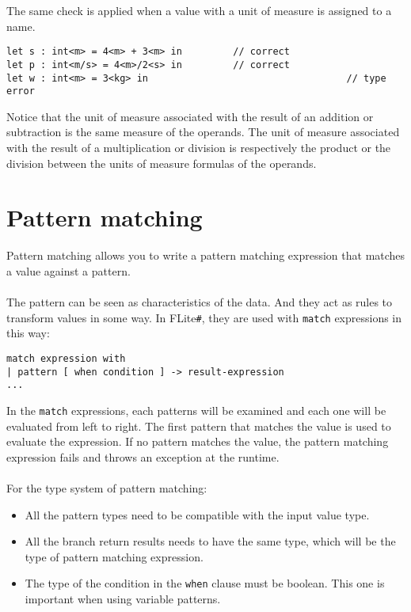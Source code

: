 \documentclass[]{article}
\begin{document}
		The same check is applied when a value with a unit of measure is assigned to a name.
		\begin{lstlisting}[caption={Units of measure with bindings}, label=UOMBind]
let s : int<m> = 4<m> + 3<m> in			// correct
let p : int<m/s> = 4<m>/2<s> in			// correct
let w : int<m> = 3<kg> in									// type error
		\end{lstlisting}
		Notice that the unit of measure associated with the result of an addition or subtraction is the same measure of the operands. The unit of measure associated with the result of a multiplication or division is respectively the product or the division between the units of measure formulas of the operands.
		
	\section{Pattern matching}
		Pattern matching allows you to write a pattern matching expression that matches a value against a pattern.\\\\

		The pattern can be seen as characteristics of the data.
		And they act as rules to transform values in some way.
		In FLite\verb|#|, they are used with \lstinline|match| expressions in this way:\\
		\begin{lstlisting}[caption={Pattern matching usage}, label=PMU]
match expression with
| pattern [ when condition ] -> result-expression
...
		\end{lstlisting}

		In the \lstinline|match| expressions, each patterns will be examined and each one will be evaluated from left to right.
		The first pattern that matches the value is used to evaluate the expression.
		If no pattern matches the value, the pattern matching expression fails and throws an exception at the runtime.\\\\

		For the type system of pattern matching:
		\begin{itemize}
			\item All the pattern types need to be compatible with the input value type.
			\item All the branch return results needs to have the same type, which will be the type of pattern matching expression.
			\item The type of the condition in the \lstinline|when| clause must be boolean. This one is important when using variable patterns.
		\end{itemize}
\end{document}
